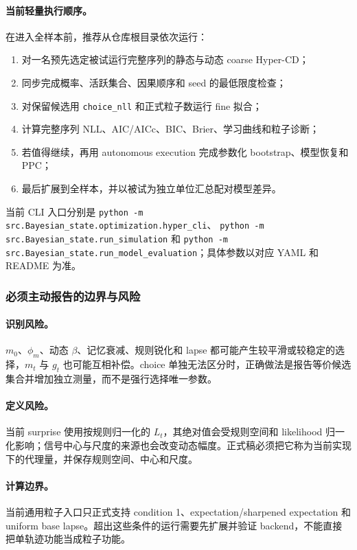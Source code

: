 \paragraph{当前轻量执行顺序。}
在进入全样本前，推荐从仓库根目录依次运行：
\begin{enumerate}
    \item 对一名预先选定被试运行完整序列的静态与动态 coarse Hyper-CD；
    \item 同步完成概率、活跃集合、因果顺序和 seed 的最低限度检查；
    \item 对保留候选用 \texttt{choice\_nll} 和正式粒子数运行 fine 拟合；
    \item 计算完整序列 NLL、AIC/AICc、BIC、Brier、学习曲线和粒子诊断；
    \item 若值得继续，再用 autonomous execution 完成参数化 bootstrap、模型恢复和 PPC；
    \item 最后扩展到全样本，并以被试为独立单位汇总配对模型差异。
\end{enumerate}
当前 CLI 入口分别是
\texttt{python -m src.Bayesian\_state.optimization.hyper\_cli}、
\texttt{python -m src.Bayesian\_state.run\_simulation} 和
\texttt{python -m src.Bayesian\_state.run\_model\_evaluation}；具体参数以对应 YAML 和 README 为准。


\subsubsection{必须主动报告的边界与风险}

\paragraph{识别风险。}
$m_0$、$\phi_m$、动态 $\beta$、记忆衰减、规则锐化和 lapse 都可能产生较平滑或较稳定的选择，$m_t$ 与 $g_t$ 也可能互相补偿。choice 单独无法区分时，正确做法是报告等价候选集合并增加独立测量，而不是强行选择唯一参数。

\paragraph{定义风险。}
当前 surprise 使用按规则归一化的 $L_t$，其绝对值会受规则空间和 likelihood 归一化影响；信号中心与尺度的来源也会改变动态幅度。正式稿必须把它称为当前实现下的代理量，并保存规则空间、中心和尺度。

\paragraph{计算边界。}
当前通用粒子入口只正式支持 condition 1、expectation/sharpened expectation 和 uniform base lapse。超出这些条件的运行需要先扩展并验证 backend，不能直接把单轨迹功能当成粒子功能。

